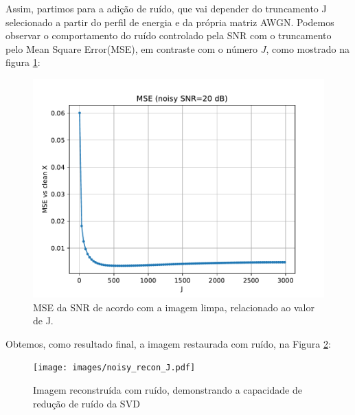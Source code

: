 	Assim, partimos para a adição de ruído, que vai depender do truncamento J selecionado a partir do perfil de energia e da própria matriz AWGN. Podemos observar o comportamento do ruído controlado pela SNR com o truncamento pelo Mean Square Error(MSE), em contraste com o número $J$, como mostrado na figura \ref{fig:mse_noise}: 
	
	\begin{figure}[!h]
		\centering
		\includegraphics[width=0.9\linewidth]{images/mse_snr_com_ruido.pdf}
		\caption{MSE da SNR de acordo com a imagem limpa, relacionado ao valor de J.}
		\label{fig:mse_noise}
	\end{figure}
	
	Obtemos, como resultado final, a imagem restaurada com ruído, na Figura \ref{fig:wave_noise}:
	
	\begin{figure}[!h]
		\centering
		\texttt{[image: images/noisy\_recon\_J.pdf]}
		\caption{Imagem reconstruída com ruído, demonstrando a capacidade de redução de ruído da SVD}
		\label{fig:wave_noise}
	\end{figure}
	
